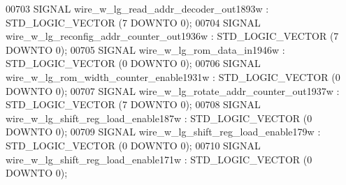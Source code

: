 \begin{DoxyCode}
{00703      \textcolor{keywordflow}{SIGNAL}  \textcolor{vhdlchar}{wire_w_lg_read_addr_decoder_out1893w}   \textcolor{vhdlchar}{:}   \textcolor{comment}{STD\_LOGIC\_VECTOR} \textcolor{vhdlchar}{(}\textcolor{vhdllogic}{}\textcolor{vhdllogic}{7} \textcolor{keywordflow}{DOWNTO} \textcolor{vhdllogic}{}\textcolor{vhdllogic}{0}\textcolor{vhdlchar}{)};
00704      \textcolor{keywordflow}{SIGNAL}  \textcolor{vhdlchar}{wire_w_lg_reconfig_addr_counter_out1936w}   \textcolor{vhdlchar}{:}   \textcolor{comment}{STD\_LOGIC\_VECTOR} \textcolor{vhdlchar}{(}\textcolor{vhdllogic}{}\textcolor{vhdllogic}{7} \textcolor{keywordflow}{DOWNTO} \textcolor{vhdllogic}{}\textcolor{vhdllogic}{0}\textcolor{vhdlchar}{)};
00705      \textcolor{keywordflow}{SIGNAL}  \textcolor{vhdlchar}{wire_w_lg_rom_data_in1946w} \textcolor{vhdlchar}{:}   \textcolor{comment}{STD\_LOGIC\_VECTOR} \textcolor{vhdlchar}{(}\textcolor{vhdllogic}{}\textcolor{vhdllogic}{0} \textcolor{keywordflow}{DOWNTO} \textcolor{vhdllogic}{}\textcolor{vhdllogic}{0}\textcolor{vhdlchar}{)};
00706      \textcolor{keywordflow}{SIGNAL}  \textcolor{vhdlchar}{wire_w_lg_rom_width_counter_enable1931w}    \textcolor{vhdlchar}{:}   \textcolor{comment}{STD\_LOGIC\_VECTOR} \textcolor{vhdlchar}{(}\textcolor{vhdllogic}{}\textcolor{vhdllogic}{0} \textcolor{keywordflow}{DOWNTO} \textcolor{vhdllogic}{}\textcolor{vhdllogic}{0}\textcolor{vhdlchar}{)};
00707      \textcolor{keywordflow}{SIGNAL}  \textcolor{vhdlchar}{wire_w_lg_rotate_addr_counter_out1937w} \textcolor{vhdlchar}{:}   \textcolor{comment}{STD\_LOGIC\_VECTOR} \textcolor{vhdlchar}{(}\textcolor{vhdllogic}{}\textcolor{vhdllogic}{7} \textcolor{keywordflow}{DOWNTO} \textcolor{vhdllogic}{}\textcolor{vhdllogic}{0}\textcolor{vhdlchar}{)};
00708      \textcolor{keywordflow}{SIGNAL}  \textcolor{vhdlchar}{wire_w_lg_shift_reg_load_enable187w}    \textcolor{vhdlchar}{:}   \textcolor{comment}{STD\_LOGIC\_VECTOR} \textcolor{vhdlchar}{(}\textcolor{vhdllogic}{}\textcolor{vhdllogic}{0} \textcolor{keywordflow}{DOWNTO} \textcolor{vhdllogic}{}\textcolor{vhdllogic}{0}\textcolor{vhdlchar}{)};
00709      \textcolor{keywordflow}{SIGNAL}  \textcolor{vhdlchar}{wire_w_lg_shift_reg_load_enable179w}    \textcolor{vhdlchar}{:}   \textcolor{comment}{STD\_LOGIC\_VECTOR} \textcolor{vhdlchar}{(}\textcolor{vhdllogic}{}\textcolor{vhdllogic}{0} \textcolor{keywordflow}{DOWNTO} \textcolor{vhdllogic}{}\textcolor{vhdllogic}{0}\textcolor{vhdlchar}{)};
00710      \textcolor{keywordflow}{SIGNAL}  \textcolor{vhdlchar}{wire_w_lg_shift_reg_load_enable171w}    \textcolor{vhdlchar}{:}   \textcolor{comment}{STD\_LOGIC\_VECTOR} \textcolor{vhdlchar}{(}\textcolor{vhdllogic}{}\textcolor{vhdllogic}{0} \textcolor{keywordflow}{DOWNTO} \textcolor{vhdllogic}{}\textcolor{vhdllogic}{0}\textcolor{vhdlchar}{)};
}
\end{DoxyCode}
